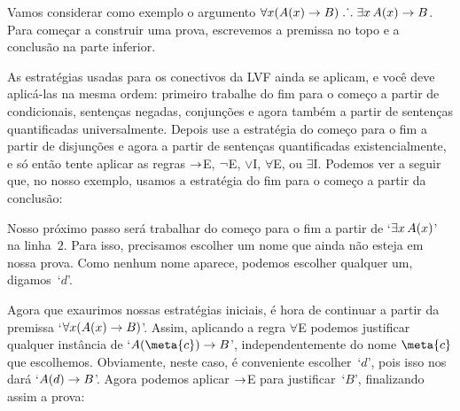 Vamos considerar como exemplo o argumento $\forall x(\mathord{A}(x) \rightarrow B) \mathrel{\ldotp\dot{}\,\ldotp} \exists x\,\mathord{A}(x) \rightarrow B$. Para começar a construir uma prova, escrevemos a premissa no topo e a conclusão na parte inferior.
\begin{fitchproof}
\ellipsesline
{}
\end{fitchproof}
As estratégias usadas para os conectivos da LVF ainda se aplicam, e você deve aplicá-las na mesma ordem: primeiro trabalhe do fim para o começo a partir de condicionais, sentenças negadas, conjunções e agora também a partir de  sentenças quantificadas universalmente. Depois use a estratégia do começo para o fim a partir de  disjunções e agora a partir de sentenças quantificadas existencialmente, e só então tente aplicar as regras $\rightarrow$E, $\neg$E, $\lor$I, $\forall$E, ou $\exists$I. Podemos ver a seguir que, no nosso exemplo, usamos a estratégia do fim para o começo a partir da conclusão:
 
\begin{fitchproof}
	\open
	\ellipsesline
	\close
\end{fitchproof}
Nosso próximo passo será trabalhar do começo para o fim a partir de `$\exists x\,\mathord{A}(x)$' na linha~$2$. Para isso, precisamos escolher um nome que ainda não esteja em nossa prova. Como nenhum nome aparece, podemos escolher qualquer um, digamos~`$d$'.
\begin{fitchproof}
	\open
	\open
	\ellipsesline
	\close
	\close
\end{fitchproof}
Agora que exaurimos nossas estratégias iniciais,  é hora de continuar  a partir da premissa `$\forall x(\mathord{A}(x) \rightarrow B)$'. Assim, aplicando a regra $\forall$E podemos justificar qualquer instância de `$A(\meta{c}) \eif B$', independentemente do nome $\meta{c}$ que escolhemos. Obviamente, neste caso, é conveniente  escolher~`$d$', pois isso nos dará  `$\mathord{A}(d) \rightarrow B$'. Agora podemos aplicar $\rightarrow$E para justificar~`$B$', finalizando assim a prova:

